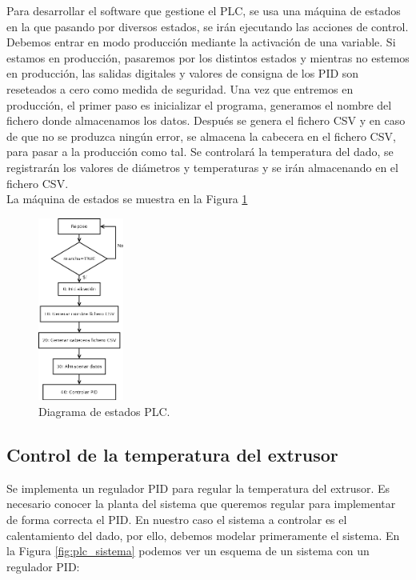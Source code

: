 Para desarrollar el software que gestione el PLC, se usa una máquina de estados en la que pasando por diversos estados, se irán ejecutando las acciones de control. Debemos entrar en modo producción mediante la activación de una variable. Si estamos en producción, pasaremos por los distintos estados y mientras no estemos en producción, las salidas digitales y valores de consigna de los PID son reseteados a cero como medida de seguridad. Una vez que entremos en producción, el primer paso es inicializar el programa, generamos el nombre del fichero donde almacenamos los datos. Después se genera el fichero CSV y en caso de que no se produzca ningún error, se almacena la cabecera en el fichero CSV, para pasar a la producción como tal. Se controlará la temperatura del dado, se registrarán los valores de diámetros y temperaturas y se irán almacenando en el fichero CSV.\\

La máquina de estados se muestra en la Figura \ref{fig:plc_estados}

\begin{figure}[H]
    \centering
    \includegraphics[width=0.25\textwidth]{images/PLC/diagrama.png}
    \caption[Diagrama de estados PLC.]{Diagrama de estados PLC.}
    \label{fig:plc_estados}
\end{figure}

\subsection{Control de la temperatura del extrusor}
\label{sec:plc_PID}

Se implementa un regulador PID para regular la temperatura del extrusor. Es necesario conocer la planta del sistema que queremos regular para implementar de forma correcta el PID. En nuestro caso el sistema a controlar es el calentamiento del dado, por ello, debemos modelar primeramente el sistema. En la Figura \ref{fig:plc_sistema} podemos ver un esquema de un sistema con un regulador PID:\\

